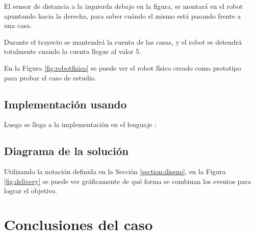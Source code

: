   El sensor de distancia a la izquierda debajo en la figura, se montará
en el robot apuntando hacia la derecha, para saber cuándo el mismo
está pasando frente a una casa.

  Durante el trayecto se mantendrá la cuenta de las casas, y el robot
se detendrá totalmente cuando la cuenta llegue al valor 5.

  En la Figura \ref{fig:robotfisico} se puede ver el
robot físico creado como prototipo para probar el caso de estudio.



\newpage
\subsection{Implementación usando \frob{}}
  Luego se llega a la implementación en el lenguaje \frob{}:



\subsection{Diagrama de la solución}
  Utilizando la notación definida en la Sección \ref{section:diseno},
en la Figura \ref{fig:delivery} se puede ver gráficamente de qué forma
se combinan los eventos para lograr el objetivo.


%







\section {Conclusiones del caso}


